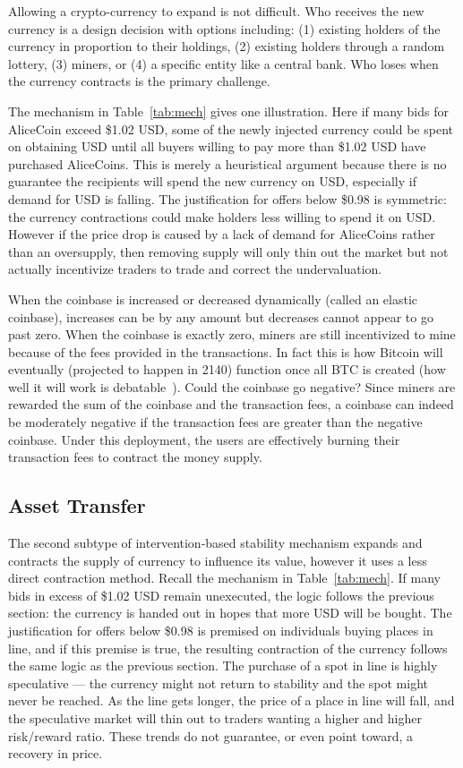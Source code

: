 Allowing a crypto-currency to expand is not difficult. Who receives the new currency is a design decision with options including: (1) existing holders of the currency in proportion to their holdings, (2) existing holders through a random lottery, (3) miners, or (4) a specific entity like a central bank. Who loses when the currency contracts is the primary challenge.

The mechanism in Table~\ref{tab:mech} gives one illustration. Here if many bids for AliceCoin exceed \$1.02 USD, some of the newly injected currency could be spent on obtaining USD until all buyers willing to pay more than \$1.02 USD have purchased AliceCoins. This is merely a heuristical argument because there is no guarantee the recipients will spend the new currency on USD, especially if demand for USD is falling. The justification for offers below \$0.98 is symmetric: the currency contractions could make holders less willing to spend it on USD. However if the price drop is caused by a lack of demand for AliceCoins rather than an oversupply, then removing supply will only thin out the market but not actually incentivize traders to trade and correct the undervaluation.

When the coinbase is increased or decreased dynamically (called an elastic coinbase), increases can be by any amount but decreases cannot appear to go past zero. When the coinbase is exactly zero, miners are still incentivized to mine because of the fees provided in the transactions. In fact this is how Bitcoin will eventually (projected to happen in 2140) function once all BTC is created (how well it will work is debatable~\cite{carlsten2016instability}). Could the coinbase go negative? Since miners are rewarded the sum of the coinbase and the transaction fees, a coinbase can indeed be moderately negative if the transaction fees are greater than the negative coinbase. Under this deployment, the users are effectively burning their transaction fees to contract the money supply.


\subsection{Asset Transfer}
\label{sec:basecoin}

The second subtype of intervention-based stability mechanism expands and contracts the supply of currency to influence its value, however it uses a less direct contraction method. Recall the mechanism in Table~\ref{tab:mech}. If many bids in excess of \$1.02 USD remain unexecuted, the logic follows the previous section: the currency is handed out in hopes that more USD will be bought. The justification for offers below \$0.98 is premised on individuals buying places in line, and if this premise is true, the resulting contraction of the currency follows the same logic as the previous section. The purchase of a spot in line is highly speculative --- the currency might not return to stability and the spot might never be reached. As the line gets longer, the price of a place in line will fall, and the speculative market will thin out to traders wanting a higher and higher risk/reward ratio. These trends do not guarantee, or even point toward, a recovery in price. 

